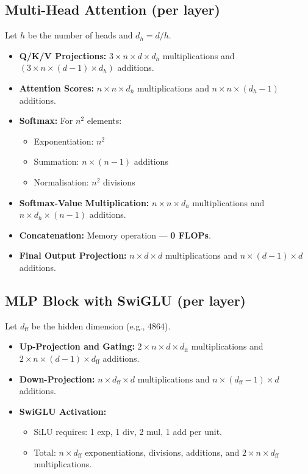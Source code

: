 \documentclass[a4paper,12pt]{article}
\begin{document}
  \subsection*{Multi-Head Attention (per layer)}
  Let $h$ be the number of heads and $d_h = d / h$.
  \begin{itemize}
    \item \textbf{Q/K/V Projections:} $3 \times n \times d \times d_h$ multiplications and $(3 \times n \times (d - 1) \times d_h)$ additions.
    \item \textbf{Attention Scores:} $n \times n \times d_h$ multiplications and $n \times n \times (d_h - 1)$ additions.
    \item \textbf{Softmax:} For $n^2$ elements:
      \begin{itemize}
        \item Exponentiation: $n^2$
        \item Summation: $n \times (n - 1)$ additions
        \item Normalisation: $n^2$ divisions
      \end{itemize}
    \item \textbf{Softmax-Value Multiplication:} $n \times n \times d_h$ multiplications and $n \times d_h \times (n - 1)$ additions.
    \item \textbf{Concatenation:} Memory operation — \textbf{0 FLOPs}.
    \item \textbf{Final Output Projection:} $n \times d \times d$ multiplications and $n \times (d - 1) \times d$ additions.
  \end{itemize}
  
  \subsection*{MLP Block with SwiGLU (per layer)}
  Let $d_{\text{ff}}$ be the hidden dimension (e.g., 4864).
  \begin{itemize}
    \item \textbf{Up-Projection and Gating:} $2 \times n \times d \times d_{\text{ff}}$ multiplications and $2 \times n \times (d - 1) \times d_{\text{ff}}$ additions.
    \item \textbf{Down-Projection:} $n \times d_{\text{ff}} \times d$ multiplications and $n \times (d_{\text{ff}} - 1) \times d$ additions.
    \item \textbf{SwiGLU Activation:}
      \begin{itemize}
        \item SiLU requires: 1 exp, 1 div, 2 mul, 1 add per unit.
        \item Total: $n \times d_{\text{ff}}$ exponentiations, divisions, additions, and $2 \times n \times d_{\text{ff}}$ multiplications.
      \end{itemize}
  \end{itemize}
  
\end{document}
